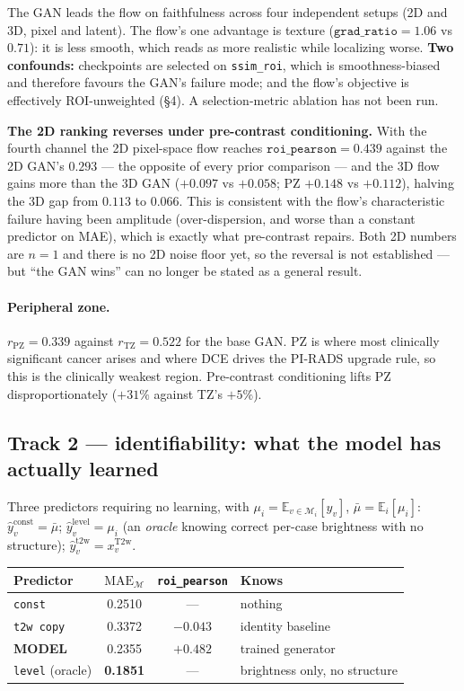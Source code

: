 \documentclass[11pt]{article}
\newcommand{\yhat}{\hat{y}}
\newcommand{\roi}{\mathcal{M}}
\newcommand{\Ex}{\mathbb{E}}
\newcommand{\1}{\mathbb{1}}
\newcommand{\flag}[1]{\textcolor{red!60!black}{\textbf{#1}}}
\begin{document}
The GAN leads the flow on faithfulness across four independent setups (2D and 3D, pixel and
latent). The flow's one advantage is texture ($\texttt{grad\_ratio}=1.06$ vs $0.71$): it is
less smooth, which reads as more realistic while localizing worse.
\flag{Two confounds:} checkpoints are selected on \texttt{ssim\_roi}, which is
smoothness-biased and therefore favours the GAN's failure mode; and the flow's objective is
effectively ROI-unweighted (\S4). A selection-metric ablation has not been run.

\flag{The 2D ranking reverses under pre-contrast conditioning.} With the fourth channel the
2D pixel-space flow reaches $\texttt{roi\_pearson}=0.439$ against the 2D GAN's $0.293$ ---
the opposite of every prior comparison --- and the 3D flow gains more than the 3D GAN
($+0.097$ vs $+0.058$; PZ $+0.148$ vs $+0.112$), halving the 3D gap from $0.113$ to $0.066$.
This is consistent with the flow's characteristic failure having been amplitude
(over-dispersion, and worse than a constant predictor on MAE), which is exactly what
pre-contrast repairs. Both 2D numbers are $n=1$ and there is no 2D noise floor yet, so the
reversal is not established --- but ``the GAN wins'' can no longer be stated as a general
result.

\paragraph{Peripheral zone.} $r_{\text{PZ}}=0.339$ against $r_{\text{TZ}}=0.522$ for the
base GAN. PZ is where most clinically significant cancer arises and where DCE drives the
PI-RADS upgrade rule, so this is the clinically weakest region. Pre-contrast conditioning
lifts PZ disproportionately ($+31\%$ against TZ's $+5\%$).

\subsection{Track 2 --- identifiability: what the model has actually learned}
\label{sec:decomp}

Three predictors requiring no learning, with $\mu_i=\Ex_{v\in\roi_i}[y_v]$,
$\bar\mu=\Ex_i[\mu_i]$:
$\yhat^{\text{const}}_v=\bar\mu$;
$\yhat^{\text{level}}_v=\mu_i$ (an \emph{oracle} knowing correct per-case brightness with no
structure); $\yhat^{\text{t2w}}_v=x^{\text{T2w}}_v$.

\begin{center}
\begin{tabular}{lccl}
\toprule
Predictor & $\mathrm{MAE}_{\roi}$ & \texttt{roi\_pearson} & Knows \\
\midrule
\texttt{const} & 0.2510 & --- & nothing \\
\texttt{t2w copy} & 0.3372 & $\mathbf{-0.043}$ & identity baseline \\
\textbf{MODEL} & 0.2355 & $\mathbf{+0.482}$ & trained generator \\
\texttt{level} (oracle) & \textbf{0.1851} & --- & brightness only, no structure \\
\bottomrule
\end{tabular}
\end{center}
\end{document}
